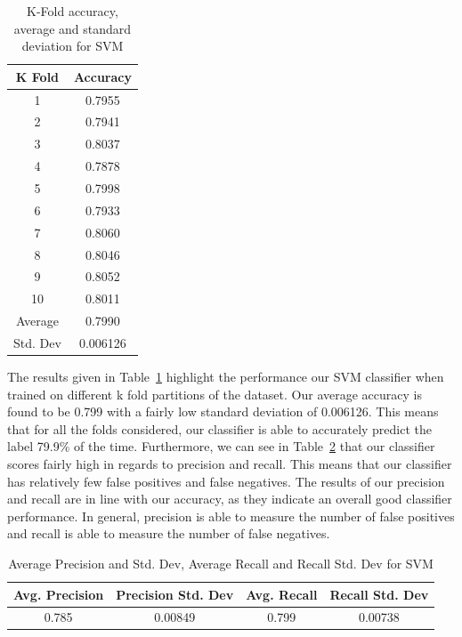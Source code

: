 \documentclass[12pt]{article}
\begin{document}
\begin{table}[H]
\centering
\begin{tabular}{|c|c|}
    \hline
    K Fold & Accuracy \\ \hline
        1       & 0.7955    \\ 
        2       & 0.7941    \\ 
        3       & 0.8037    \\ 
        4       & 0.7878    \\ 
        5       & 0.7998    \\ 
        6       & 0.7933    \\ 
        7       & 0.8060    \\ 
        8       & 0.8046    \\ 
        9       & 0.8052    \\ 
        10      & 0.8011    \\ 
    \hline
Average & 0.7990 \\ 
Std. Dev & 0.006126 \\ \hline
\end{tabular}
\caption{K-Fold accuracy, average and standard deviation for SVM}\label{tab:svm_acc}
\end{table}

The results given in Table~\ref{tab:svm_acc} highlight the performance our SVM classifier when trained on different k fold partitions of the dataset. Our average accuracy is found to be 0.799 with a fairly low standard deviation of 0.006126. This means that for all the folds considered, our classifier is able to accurately predict the label 79.9\% of the time. Furthermore, we can see in Table~\ref{tab:svm_prec_rec} that our classifier scores fairly high in regards to precision and recall. This means that our classifier has relatively few false positives and false negatives. The results of our precision and recall are in line with our accuracy, as they indicate an overall good classifier performance. In general, precision is able to measure the number of false positives and recall is able to measure the number of false negatives.

\begin{table}[H]
\centering
\begin{tabular}{|c|c|c|c|}
\hline
Avg. Precision & Precision Std. Dev & Avg. Recall & Recall Std. Dev \\ \hline
0.785 & 0.00849 & 0.799 & 0.00738 \\ \hline
\end{tabular}
\caption{Average Precision and Std. Dev, Average Recall and Recall Std. Dev for SVM}\label{tab:svm_prec_rec}
\end{table}
\end{document}
